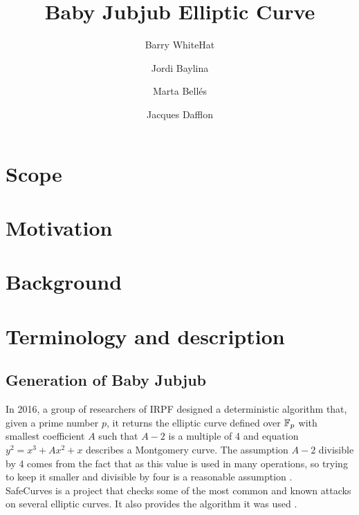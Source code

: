 \documentclass{article}
\title{ Baby Jubjub Elliptic Curve \vspace{-0.2cm} }
\author[1]{Barry WhiteHat}
\author[2]{Jordi Baylina}
\author[2,3]{Marta Bellés}
\author[2]{Jacques Dafflon}
\affil[1]{Ethereum foundation}
\affil[2]{iden3}
\affil[3]{Universitat Pompeu Fabra}
\date{} %
\begin{document}
\begin{spacing}{1.2}	
\maketitle 
\vspace{1.5cm}
\tableofcontents
\vspace{0.5cm}


\newpage

\section{Scope}
	

\section{Motivation}
	

\section{Background}
	

\section{Terminology and description}
	\subsection{Generation of Baby Jubjub}

	In 2016, a group of researchers of IRPF designed a deterministic algorithm that, given a prime number $p$, it returns the elliptic curve defined over $\mathbb{F}_p$ with smallest coefficient $A$ such that $A-2$ is a multiple of 4 and equation $y^2 = x^3 + Ax^2 + x$ describes a Montgomery curve. The assumption $A-2$ divisible by 4 comes from the fact that as 
	this value is used in many operations, so trying to keep it smaller and divisible by four is a reasonable assumption \cite{generation-baby}. \\

	SafeCurves is a project that checks some of the most common and known attacks on several elliptic curves. It also provides the algorithm it was used \cite{safe-curves}.\\ 
	

\end{spacing}
\end{document}
